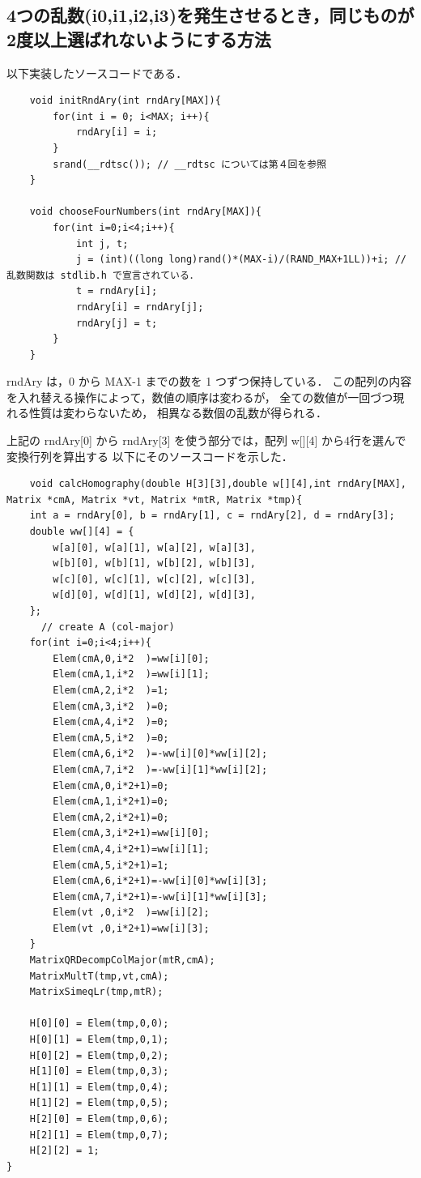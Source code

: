 \documentclass[11pt]{jarticle}
\begin{document}
\subsection{4つの乱数(i0,i1,i2,i3)を発生させるとき，同じものが2度以上選ばれないようにする方法}
以下実装したソースコードである．
\begin{verbatim}
    void initRndAry(int rndAry[MAX]){
        for(int i = 0; i<MAX; i++){
            rndAry[i] = i;
        }
        srand(__rdtsc()); // __rdtsc については第４回を参照
    }

    void chooseFourNumbers(int rndAry[MAX]){
        for(int i=0;i<4;i++){
            int j, t;
            j = (int)((long long)rand()*(MAX-i)/(RAND_MAX+1LL))+i; // 乱数関数は stdlib.h で宣言されている．
            t = rndAry[i]; 
            rndAry[i] = rndAry[j]; 
            rndAry[j] = t;
        }
    }
\end{verbatim}
rndAry は，0 から MAX-1 までの数を 1 つずつ保持している． この配列の内容を入れ替える操作によって，数値の順序は変わるが，
全ての数値が一回づつ現れる性質は変わらないため， 相異なる数個の乱数が得られる．

上記の rndAry[0] から rndAry[3] を使う部分では，配列 w[][4] から4行を選んで変換行列を算出する
以下にそのソースコードを示した．

\begin{verbatim}
    void calcHomography(double H[3][3],double w[][4],int rndAry[MAX], Matrix *cmA, Matrix *vt, Matrix *mtR, Matrix *tmp){
    int a = rndAry[0], b = rndAry[1], c = rndAry[2], d = rndAry[3];
    double ww[][4] = {
        w[a][0], w[a][1], w[a][2], w[a][3],
        w[b][0], w[b][1], w[b][2], w[b][3],
        w[c][0], w[c][1], w[c][2], w[c][3],
        w[d][0], w[d][1], w[d][2], w[d][3],
    };
      // create A (col-major)
    for(int i=0;i<4;i++){
        Elem(cmA,0,i*2  )=ww[i][0];
        Elem(cmA,1,i*2  )=ww[i][1];
        Elem(cmA,2,i*2  )=1;
        Elem(cmA,3,i*2  )=0;
        Elem(cmA,4,i*2  )=0;
        Elem(cmA,5,i*2  )=0;
        Elem(cmA,6,i*2  )=-ww[i][0]*ww[i][2];
        Elem(cmA,7,i*2  )=-ww[i][1]*ww[i][2];
        Elem(cmA,0,i*2+1)=0;
        Elem(cmA,1,i*2+1)=0;
        Elem(cmA,2,i*2+1)=0;
        Elem(cmA,3,i*2+1)=ww[i][0];
        Elem(cmA,4,i*2+1)=ww[i][1];
        Elem(cmA,5,i*2+1)=1;
        Elem(cmA,6,i*2+1)=-ww[i][0]*ww[i][3];
        Elem(cmA,7,i*2+1)=-ww[i][1]*ww[i][3];
        Elem(vt ,0,i*2  )=ww[i][2];
        Elem(vt ,0,i*2+1)=ww[i][3];
    }
    MatrixQRDecompColMajor(mtR,cmA);
    MatrixMultT(tmp,vt,cmA);
    MatrixSimeqLr(tmp,mtR);

    H[0][0] = Elem(tmp,0,0);
    H[0][1] = Elem(tmp,0,1);
    H[0][2] = Elem(tmp,0,2);
    H[1][0] = Elem(tmp,0,3);
    H[1][1] = Elem(tmp,0,4);
    H[1][2] = Elem(tmp,0,5);
    H[2][0] = Elem(tmp,0,6);
    H[2][1] = Elem(tmp,0,7);
    H[2][2] = 1;
}
\end{verbatim}
\end{document}
